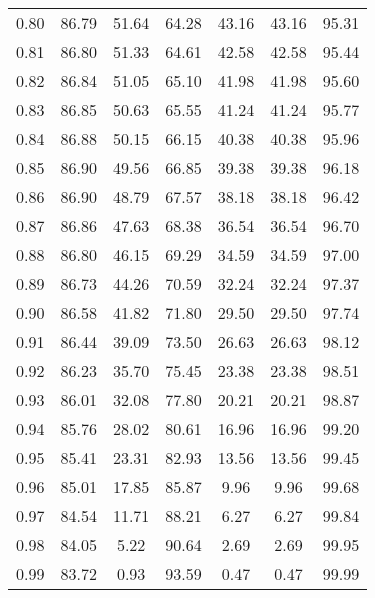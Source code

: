 \begin{tabular}{|c|c|c|c|c|c|c|}
      0.80 &     86.79 &     51.64 &      64.28 &   43.16 &      43.16 &         95.31 \\
      0.81 &     86.80 &     51.33 &      64.61 &   42.58 &      42.58 &         95.44 \\
      0.82 &     86.84 &     51.05 &      65.10 &   41.98 &      41.98 &         95.60 \\
      0.83 &     86.85 &     50.63 &      65.55 &   41.24 &      41.24 &         95.77 \\
      0.84 &     86.88 &     50.15 &      66.15 &   40.38 &      40.38 &         95.96 \\
      0.85 &     86.90 &     49.56 &      66.85 &   39.38 &      39.38 &         96.18 \\
      0.86 &     86.90 &     48.79 &      67.57 &   38.18 &      38.18 &         96.42 \\
      0.87 &     86.86 &     47.63 &      68.38 &   36.54 &      36.54 &         96.70 \\
      0.88 &     86.80 &     46.15 &      69.29 &   34.59 &      34.59 &         97.00 \\
      0.89 &     86.73 &     44.26 &      70.59 &   32.24 &      32.24 &         97.37 \\
      0.90 &     86.58 &     41.82 &      71.80 &   29.50 &      29.50 &         97.74 \\
      0.91 &     86.44 &     39.09 &      73.50 &   26.63 &      26.63 &         98.12 \\
      0.92 &     86.23 &     35.70 &      75.45 &   23.38 &      23.38 &         98.51 \\
      0.93 &     86.01 &     32.08 &      77.80 &   20.21 &      20.21 &         98.87 \\
      0.94 &     85.76 &     28.02 &      80.61 &   16.96 &      16.96 &         99.20 \\
      0.95 &     85.41 &     23.31 &      82.93 &   13.56 &      13.56 &         99.45 \\
      0.96 &     85.01 &     17.85 &      85.87 &    9.96 &       9.96 &         99.68 \\
      0.97 &     84.54 &     11.71 &      88.21 &    6.27 &       6.27 &         99.84 \\
      0.98 &     84.05 &      5.22 &      90.64 &    2.69 &       2.69 &         99.95 \\
      0.99 &     83.72 &      0.93 &      93.59 &    0.47 &       0.47 &         99.99 \\
\bottomrule
\end{tabular}

